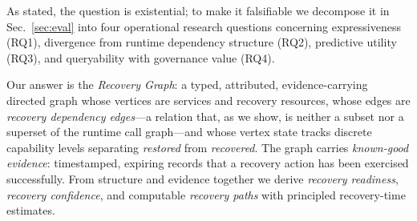 \noindent As stated, the question is existential; to make it falsifiable we decompose it in Sec.~\ref{sec:eval} into four operational research questions concerning expressiveness (RQ1), divergence from runtime dependency structure (RQ2), predictive utility (RQ3), and queryability with governance value (RQ4).

Our answer is the \emph{Recovery Graph}: a typed, attributed, evidence-carrying directed graph whose vertices are services and recovery resources, whose edges are \emph{recovery dependency edges}---a relation that, as we show, is neither a subset nor a superset of the runtime call graph---and whose vertex state tracks discrete capability levels separating \emph{restored} from \emph{recovered}. The graph carries \emph{known-good evidence}: timestamped, expiring records that a recovery action has been exercised successfully. From structure and evidence together we derive \emph{recovery readiness}, \emph{recovery confidence}, and computable \emph{recovery paths} with principled recovery-time estimates.

